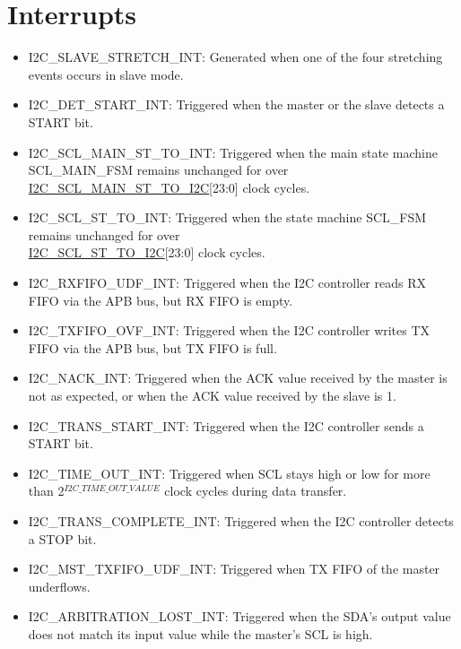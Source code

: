 \documentclass[main\_\_EN.tex]{subfiles}
\begin{document}
\section{Interrupts}\label{sub:i2c-int}
\begin{itemize}
\item \label{int:i2c-slave-stretch}I2C\_SLAVE\_STRETCH\_INT: Generated when one of the four stretching events occurs in slave mode.
\item \label{int:i2c-start}I2C\_DET\_START\_INT: Triggered when the master or the slave detects a START bit.
\item \label{int:i2c-scl-main-fsm}I2C\_SCL\_MAIN\_ST\_TO\_INT: Triggered when the main state machine SCL\_MAIN\_FSM remains unchanged for over \hyperref[fielddesc:I2CSCLMAINSTTOI2C]{I2C\_SCL\_MAIN\_ST\_TO\_I2C}[23:0] clock cycles.
\item \label{int:i2c-scl-fsm}I2C\_SCL\_ST\_TO\_INT: Triggered when the state machine SCL\_FSM remains unchanged for over \\\hyperref[fielddesc:I2CSCLSTTOI2C]{I2C\_SCL\_ST\_TO\_I2C}[23:0] clock cycles.
\item \label{int:i2c-rxfifo-udf}I2C\_RXFIFO\_UDF\_INT: Triggered when the I2C controller reads RX FIFO via the APB bus, but RX FIFO is empty.
\item \label{int:i2c-txfifo-ovf}I2C\_TXFIFO\_OVF\_INT: Triggered when the I2C controller writes TX FIFO via the APB bus, but TX FIFO is full.
\item \label{int:i2c-nack}I2C\_NACK\_INT: Triggered when the ACK value received by the master is not as expected, or when the ACK value received by the slave is 1.
\item \label{int:i2c-trans-start}I2C\_TRANS\_START\_INT: Triggered when the I2C controller sends a START bit.
\item \label{int:i2c-time-out}I2C\_TIME\_OUT\_INT: Triggered when SCL stays high or low for more than 2$^{\hyperref[fielddesc:I2CTIMEOUTVALUE]{I2C\_TIME\_OUT\_VALUE}}$ clock cycles during data transfer.
\item \label{int:i2c-trans-complete}I2C\_TRANS\_COMPLETE\_INT: Triggered when the I2C controller detects a STOP bit.
\item \label{int:i2c-mst-txfifo-udf}I2C\_MST\_TXFIFO\_UDF\_INT: Triggered when TX FIFO of the master underflows.
\item \label{int:i2c-arbitration-lost}I2C\_ARBITRATION\_LOST\_INT: Triggered when the SDA's output value does not match its input value while the master's SCL is high.

\end{itemize}
\end{document}
